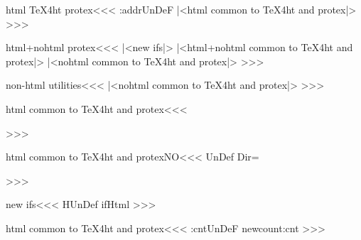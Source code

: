 % 
%
%
%
% 





\<html TeX4ht protex\><<<
\ifx\html:addr\:UnDeF
   |<html common to TeX4ht and protex|>
   \Htmltrue
\fi
>>>

\ifalprotex

\<html+nohtml protex\><<<
|<new ifs|>
|<html+nohtml common to TeX4ht and protex|>
|<nohtml common to TeX4ht and protex|>
>>>

\fi

\<non-html utilities\><<<
|<nohtml common to TeX4ht and protex|>
>>>



\<html common to TeX4ht and protex\><<<
\immediate{}%
>>>




\<html common to TeX4ht and protexNO\><<<
\ifx\HDir\:UnDef \let\HDir=\empty \fi
\let\:HDir=\HDir
\immediate\write16{--- needs --- TeX4ht \ifx\HDir\empty
               \else-d \HDir\space\space\fi \jobname\space ---}%
>>>




\<new ifs\><<<
\ifx \Htmltrue\:UnDef
   \def\:temp{\csname newif\endcsname}
   \expandafter{} \csname ifHtml\endcsname  \Htmlfalse
\fi
>>>


\<html common to TeX4ht and protex\><<<
\ifx\tmp:cnt\:UnDeF    \csname newcount\endcsname\tmp:cnt \fi
\def\g:advance#1{\bgroup \def\:temp{#1}%
                 \tmp:cnt=#1\afterassignment\:gplus \advance\tmp:cnt}
\def\:gplus{\expandafter\xdef\:temp{\the\tmp:cnt}\egroup}
\def\html:lbl{1}
\def\html:addr{\xdef\last:haddr{\file:id-\html:lbl}%
     \g:advance\html:lbl by 1\relax }
>>>

